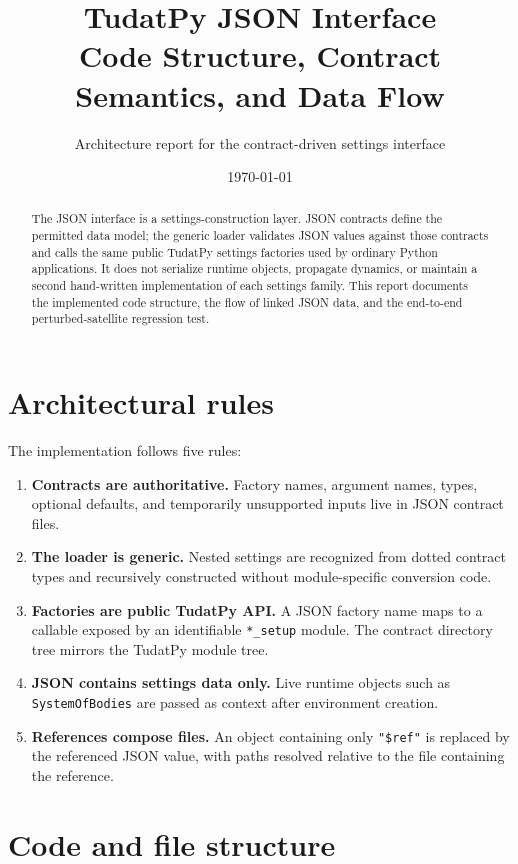 \documentclass[10pt,a4paper]{article}
\title{\vspace{-12mm}\textbf{TudatPy JSON Interface}\\[1mm]
\large Code Structure, Contract Semantics, and Data Flow}
\author{Architecture report for the contract-driven settings interface}
\date{\today}
\newcommand{\code}[1]{\texttt{#1}}
\begin{document}
\maketitle
\vspace{-4mm}

\begin{abstract}
The JSON interface is a settings-construction layer. JSON contracts define the
permitted data model; the generic loader validates JSON values against those
contracts and calls the same public TudatPy settings factories used by ordinary
Python applications. It does not serialize runtime objects, propagate dynamics,
or maintain a second hand-written implementation of each settings family. This
report documents the implemented code structure, the flow of linked JSON data,
and the end-to-end perturbed-satellite regression test.
\end{abstract}

\section{Architectural rules}

The implementation follows five rules:

\begin{enumerate}[leftmargin=7mm,itemsep=1.5mm]
  \item \textbf{Contracts are authoritative.} Factory names, argument names,
        types, optional defaults, and temporarily unsupported inputs live in JSON
        contract files.
  \item \textbf{The loader is generic.} Nested settings are recognized from
        dotted contract types and recursively constructed without module-specific
        conversion code.
  \item \textbf{Factories are public TudatPy API.} A JSON factory name maps to a
        callable exposed by an identifiable \code{*\_setup} module. The
        contract directory tree mirrors the TudatPy module tree.
  \item \textbf{JSON contains settings data only.} Live runtime objects such as
        \code{SystemOfBodies} are passed as context after environment creation.
  \item \textbf{References compose files.} An object containing only
        \code{"\$ref"} is replaced by the referenced JSON value, with paths
        resolved relative to the file containing the reference.
\end{enumerate}

\section{Code and file structure}
\end{document}
